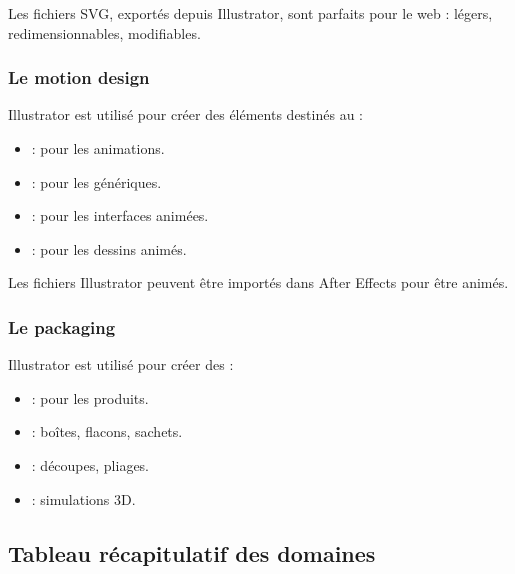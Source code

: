 Les fichiers SVG, exportés depuis Illustrator, sont parfaits pour le web : légers, redimensionnables, modifiables.

\subsubsection{Le motion design}

Illustrator est utilisé pour créer des éléments destinés au  :

\begin{itemize}
    \item {} : pour les animations.
    \item {} : pour les génériques.
    \item {} : pour les interfaces animées.
    \item {} : pour les dessins animés.
\end{itemize}

Les fichiers Illustrator peuvent être importés dans After Effects pour être animés.

\subsubsection{Le packaging}

Illustrator est utilisé pour créer des  :

\begin{itemize}
    \item {} : pour les produits.
    \item {} : boîtes, flacons, sachets.
    \item {} : découpes, pliages.
    \item {} : simulations 3D.
\end{itemize}

\subsection{Tableau récapitulatif des domaines}

